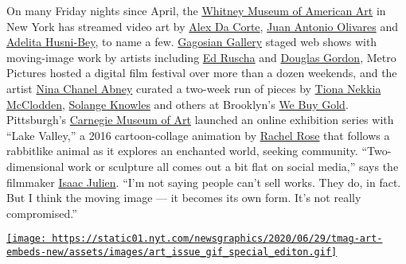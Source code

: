 On many Friday nights since April, the
\href{https://www.nytimes.com/topic/organization/whitney-museum-of-american-art}{Whitney
Museum of American Art} in New York has streamed video art by
\href{https://www.nytimes.com/2018/02/16/t-magazine/alex-da-corte-st-vincent.html}{Alex
Da Corte}, \href{https://whitney.org/artists/18064}{Juan Antonio
Olivares} and
\href{https://www.newmuseum.org/exhibitions/view/adelita-husni-bey-chiron}{Adelita
Husni-Bey}, to name a few. \href{https://gagosian.com/}{Gagosian
Gallery} staged web shows with moving-image work by artists including
\href{https://www.nytimes.com/2020/01/15/arts/design/ed-ruscha.html}{Ed
Ruscha} and \href{https://gagosian.com/artists/douglas-gordon/}{Douglas
Gordon}, Metro Pictures hosted a digital film festival over more than a
dozen weekends, and the artist
\href{https://www.nytimes.com/2018/06/13/t-magazine/artist-work-habits-camille-henrot-nina-chanel-abney.html}{Nina
Chanel Abney} curated a two-week run of pieces by
\href{https://www.nytimes.com/2019/05/09/arts/design/whitney-museum-biennial-artists.html}{Tiona
Nekkia McClodden},
\href{https://www.nytimes.com/2018/10/15/t-magazine/solange-interview.html}{Solange
Knowles} and others at Brooklyn's \href{https://webuygold.wtf/}{We Buy
Gold}. Pittsburgh's
\href{https://www.nytimes.com/2015/07/10/arts/design/carnegie-museum-to-open-a-survey-of-the-designer-peter-muller-munk.html}{Carnegie
Museum of Art} launched an online exhibition series with ``Lake
Valley,'' a 2016 cartoon-collage animation by
\href{https://www.artsy.net/artist/rachel-rose}{Rachel Rose} that
follows a rabbitlike animal as it explores an enchanted world, seeking
community. ``Two-dimensional work or sculpture all comes out a bit flat
on social media,'' says the filmmaker
\href{https://www.nytimes.com/2014/02/18/arts/international/facing-the-camera.html}{Isaac
Julien}. ``I'm not saying people can't sell works. They do, in fact. But
I think the moving image --- it becomes its own form. It's not really
compromised.''

\href{https://www.nytimes.com/issue/t-magazine/2020/07/02/true-believers-art-issue}{\texttt{[image: https://static01.nyt.com/newsgraphics/2020/06/29/tmag-art-embeds-new/assets/images/art\_issue\_gif\_special\_editon.gif]}}

